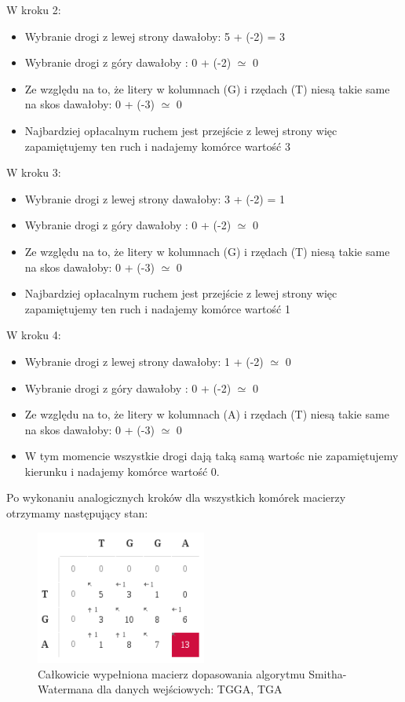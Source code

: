 \documentclass[a4paper,12pt]{article}
\newenvironment{lista}{
\begin{itemize}
  \setlength{\itemsep}{1pt}
  \setlength{\parskip}{0pt}
  \setlength{\parsep}{0pt}
}{\end{itemize}}
\begin{document}
W kroku 2:
\begin{lista}
\item Wybranie drogi z lewej strony dawałoby: 5 + (-2) = 3
\item Wybranie drogi z góry dawałoby : 0 + (-2) $\simeq$ 0
\item Ze względu na to, że litery w kolumnach (G) i rzędach (T) niesą takie same na skos dawałoby: 0 + (-3) $\simeq$ 0
\item Najbardziej opłacalnym ruchem jest przejście z lewej strony więc zapamiętujemy ten ruch i nadajemy komórce wartość 3
\end{lista}
W kroku 3:
\begin{lista}
\item Wybranie drogi z lewej strony dawałoby: 3 + (-2) = 1
\item Wybranie drogi z góry dawałoby : 0 + (-2) $\simeq$ 0
\item Ze względu na to, że litery w kolumnach (G) i rzędach (T) niesą takie same na skos dawałoby: 0 + (-3) $\simeq$ 0
\item Najbardziej opłacalnym ruchem jest przejście z lewej strony więc zapamiętujemy ten ruch i nadajemy komórce wartość 1
\end{lista}
W kroku 4:
\begin{lista}
\item Wybranie drogi z lewej strony dawałoby: 1 + (-2) $\simeq$ 0
\item Wybranie drogi z góry dawałoby : 0 + (-2) $\simeq$ 0
\item Ze względu na to, że litery w kolumnach (A) i rzędach (T) niesą takie same na skos dawałoby: 0 + (-3) $\simeq$ 0
\item W tym momencie wszystkie drogi dają taką samą wartośc nie zapamiętujemy kierunku i nadajemy komórce wartość 0.
\end{lista}


Po wykonaniu analogicznych kroków dla wszystkich komórek macierzy otrzymamy następujący stan:
\begin{figure}[h]
  \vspace{5pt}
  \centering
  \begin{center}
  \includegraphics[width=0.5\textwidth]{images/SchematDzialaniaAlgorytmuPelnaMacierz.png}
  \end{center}
  \caption{Całkowicie wypełniona macierz dopasowania algorytmu Smitha-Watermana dla danych wejściowych: TGGA, TGA}
 \end{figure}
\end{document}
